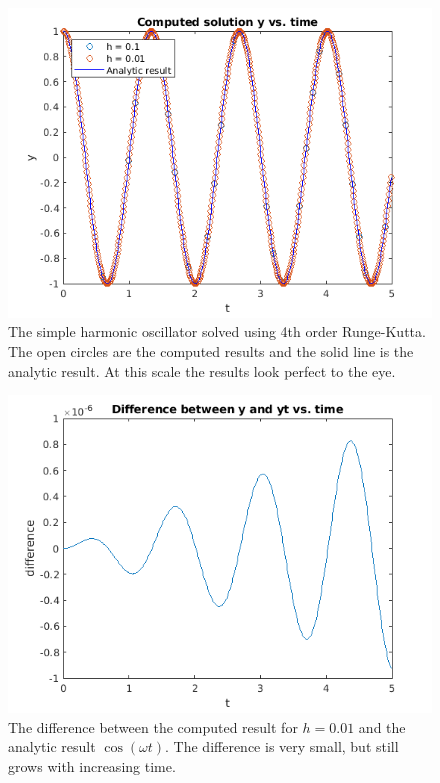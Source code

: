 \documentclass[hidelinks,notitlepage]{book}
\begin{document}
\begin{figure}[tbh]
	\centering
	\includegraphics[width=0.7\columnwidth]{RK4SHO.png}
	\caption{The simple harmonic oscillator solved using 4th order Runge-Kutta.  The open circles are the computed results and the solid line is the analytic result.  At this scale the results look perfect to the eye.}
	\label{fig:RK4SHO}
\end{figure}
\begin{figure}[tbh]
	\centering
	\includegraphics[width=0.7\columnwidth]{RK4SHODiff.png}
	\caption{The difference between the computed result for $h = 0.01$ and the analytic result $\cos(\omega t)$.  The difference is very small, but still grows with increasing time.}
	\label{fig:RK4SHODiff}
\end{figure}
\end{document}
